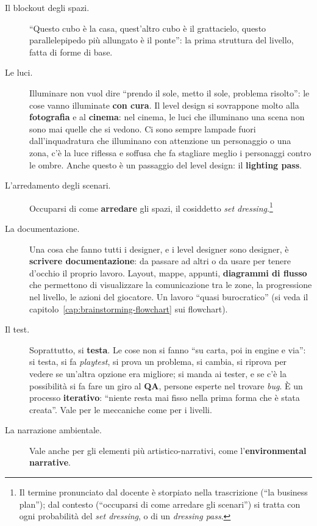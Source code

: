 \begin{description}
  \item[Il blockout degli spazi.] ``Questo cubo è la casa, quest'altro cubo
        è il grattacielo, questo parallelepipedo più allungato è il ponte'':
        la prima struttura del livello, fatta di forme di base.
  \item[Le luci.] Illuminare non vuol dire ``prendo il sole, metto il sole,
        problema risolto'': le cose vanno illuminate \textbf{con cura}. Il
        level design si sovrappone molto alla \textbf{fotografia} e al
        \textbf{cinema}: nel cinema, le luci che illuminano una scena non
        sono mai quelle che si vedono. Ci sono sempre lampade fuori
        dall'inquadratura che illuminano con attenzione un personaggio o una
        zona, c'è la luce riflessa e soffusa che fa stagliare meglio i
        personaggi contro le ombre. Anche questo è un passaggio del level
        design: il \textbf{lighting pass}.
  \item[L'arredamento degli scenari.] Occuparsi di come
        \textbf{arredare} gli spazi, il cosiddetto \emph{set
        dressing}.\footnote{Il termine pronunciato dal docente è storpiato
        nella trascrizione (``la business plan''); dal contesto (``occuparsi di
        come arredare gli scenari'') si tratta con ogni probabilità del
        \emph{set dressing}, o di un \emph{dressing pass}.}
  \item[La documentazione.] Una cosa che fanno tutti i designer, e i level
        designer sono designer, è \textbf{scrivere documentazione}: da
        passare ad altri o da usare per tenere d'occhio il proprio lavoro.
        Layout, mappe, appunti, \textbf{diagrammi di flusso} che permettono
        di visualizzare la comunicazione tra le zone, la progressione nel
        livello, le azioni del giocatore. Un lavoro ``quasi burocratico''
        (si veda il capitolo~\ref{cap:brainstorming-flowchart} sui
        flowchart).
  \item[Il test.] Soprattutto, si \textbf{testa}. Le cose non si fanno ``su
        carta, poi in engine e via'': si testa, si fa \emph{playtest}, si
        prova un problema, si cambia, si riprova per vedere se un'altra
        opzione era migliore; si manda ai tester, e se c'è la possibilità si
        fa fare un giro al \textbf{QA}, persone esperte nel trovare
        \emph{bug}. È un processo \textbf{iterativo}: ``niente resta mai fisso
        nella prima forma che è stata creata''. Vale per le meccaniche come
        per i livelli.
  \item[La narrazione ambientale.] Vale anche per gli elementi più
        artistico-narrativi, come l'\textbf{environmental narrative}.
\end{description}


